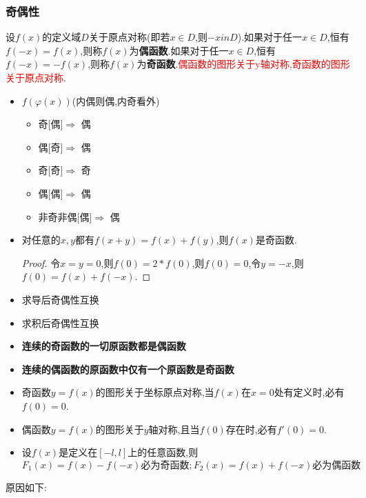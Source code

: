 \documentclass[12pt, a4paper, oneside, UTF8]{ctexbook}  %
\begin{document}
\subsubsection{奇偶性}
\begin{defn}{}{}
    设$f(x)$的定义域$D$关于原点对称(即若$x \in D$,则$-x in D$).如果对于任一$x \in D$,恒有$f(-x)=f(x)$,则称$f(x)$为\textbf{偶函数}.如果对于任一$x \in D$,恒有$f(-x)=-f(x)$,则称$f(x)$为\textbf{奇函数}.\textcolor{red}{偶函数的图形关于y轴对称,奇函数的图形关于原点对称}.\equiv
\end{defn}
\begin{criterion}{}{}
    \begin{itemize}
        \item $f(\varphi(x))$(内偶则偶,内奇看外)
              \begin{itemize}
                  \item 奇[偶]$\Rightarrow$ 偶
                  \item 偶[奇]$\Rightarrow$ 偶
                  \item 奇[奇]$\Rightarrow$ 奇
                  \item 偶[偶]$\Rightarrow$ 偶
                  \item 非奇非偶[偶]$\Rightarrow$ 偶
              \end{itemize}
        \item 对任意的$x,y$都有$f(x+y)=f(x)+f(y)$,则$f(x)$是奇函数.
              \begin{proof}
                  令$x=y=0$,则$f(0)=2*f(0)$,则$f(0)=0$,令$y=-x$,则$f(0)=f(x)+f(-x).$
              \end{proof}
        \item 求导后奇偶性互换
        \item 求积后奇偶性互换
        \item \textbf{连续的奇函数的一切原函数都是偶函数}
        \item \textbf{连续的偶函数的原函数中仅有一个原函数是奇函数}
        \item 奇函数$y=f(x)$的图形关于坐标原点对称,当$f(x)$在$x=0$处有定义时,必有$f(0)=0$.
        \item 偶函数$y=f(x)$的图形关于$y$轴对称,且当$f(0)$存在时,必有$f'(0)=0$.
        \item     设$f(x)$是定义在$[-l,l]$上的任意函数,则
              $$
                  F_1(x)=f(x)-f(-x)\text{必为奇函数};F_2(x)=f(x)+f(-x)\text{必为偶函数}
              $$
    \end{itemize}
    原因如下:
    \begin{figure}[H]

\end{figure}
\end{criterion}
\end{document}
